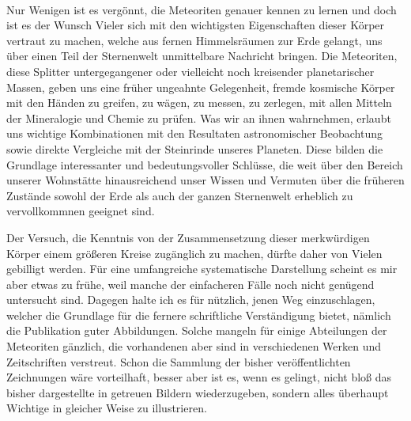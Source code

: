 \documentclass[a4paper, 12pt, oneside]{article}
\begin{document}
\paragraph*{}
Nur Wenigen ist es vergönnt, die Meteoriten genauer kennen zu lernen und doch ist es der Wunsch Vieler sich mit den wichtigsten Eigenschaften dieser Körper vertraut zu machen, welche aus fernen Himmelsräumen zur Erde gelangt, uns über einen Teil der Sternenwelt unmittelbare Nachricht bringen. Die Meteoriten, diese Splitter untergegangener oder vielleicht noch kreisender planetarischer Massen, geben uns eine früher ungeahnte Gelegenheit, fremde kosmische Körper mit den Händen zu greifen, zu wägen, zu messen, zu zerlegen, mit allen Mitteln der Mineralogie und Chemie zu prüfen. Was wir an ihnen wahrnehmen, erlaubt uns wichtige Kombinationen mit den Resultaten astronomischer Beobachtung sowie direkte Vergleiche mit der Steinrinde unseres Planeten. Diese bilden die Grundlage interessanter und bedeutungsvoller Schlüsse, die weit über den Bereich unserer Wohnstätte hinausreichend unser Wissen und Vermuten über die früheren Zustände sowohl der Erde als auch der ganzen Sternenwelt erheblich zu vervollkommnen geeignet sind.

Der Versuch, die Kenntnis von der Zusammensetzung dieser merkwürdigen Körper einem größeren Kreise zugänglich zu machen, dürfte daher von Vielen gebilligt werden. Für eine umfangreiche systematische Darstellung scheint es mir aber etwas zu frühe, weil manche der einfacheren Fälle noch nicht genügend untersucht sind. Dagegen halte ich es für nützlich, jenen Weg einzuschlagen, welcher die Grundlage für die fernere schriftliche Verständigung bietet, nämlich die Publikation guter Abbildungen. Solche mangeln für einige Abteilungen der Meteoriten gänzlich, die vorhandenen aber sind in verschiedenen Werken und Zeitschriften verstreut. Schon die Sammlung der bisher veröffentlichten Zeichnungen wäre vorteilhaft, besser aber ist es, wenn es gelingt, nicht bloß das bisher dargestellte in getreuen Bildern wiederzugeben, sondern alles überhaupt Wichtige in gleicher Weise zu illustrieren.
\end{document}
